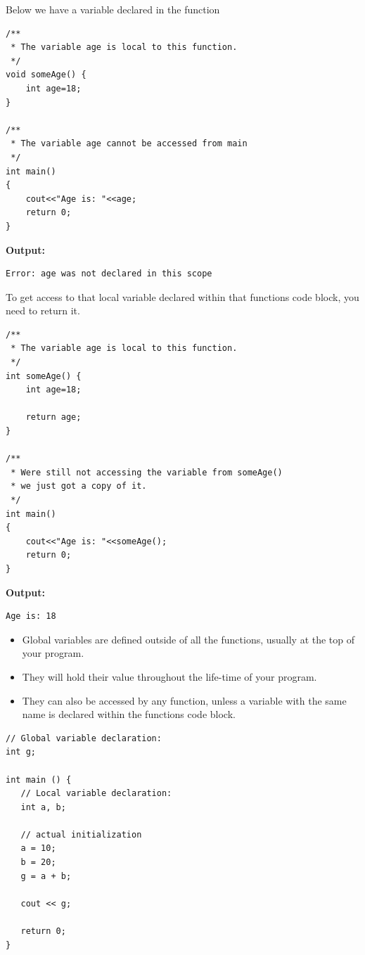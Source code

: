 
Below we have a variable declared in the function  

\begin{verbatim}
/**
 * The variable age is local to this function.
 */
void someAge() {    
    int age=18;     
} 
 
/**
 * The variable age cannot be accessed from main
 */
int main() 
{ 
    cout<<"Age is: "<<age; 
    return 0; 
}
\end{verbatim}

\textbf{Output:}
\begin{verbatim}
Error: age was not declared in this scope
\end{verbatim}

To get access to that local variable declared within that functions code block, you need to return it. 
\begin{verbatim}
/**
 * The variable age is local to this function.
 */
int someAge() {    
    int age=18;   
    
    return age;
} 
 
/**
 * Were still not accessing the variable from someAge()
 * we just got a copy of it. 
 */
int main() 
{ 
    cout<<"Age is: "<<someAge(); 
    return 0; 
}
\end{verbatim}

\textbf{Output:}
\begin{verbatim}
Age is: 18
\end{verbatim}


\begin{itemize}
\tightlist
    \item Global variables are defined outside of all the functions, usually at the top of your program.
    \item They will hold their value throughout the life-time of your program.
    \item They can also be accessed by any function, unless a variable with the same name is declared within the functions code block. 
\end{itemize}
 

\begin{verbatim}
// Global variable declaration:
int g;
 
int main () {
   // Local variable declaration:
   int a, b;
 
   // actual initialization
   a = 10;
   b = 20;
   g = a + b;
  
   cout << g;
 
   return 0;
}
\end{verbatim}

